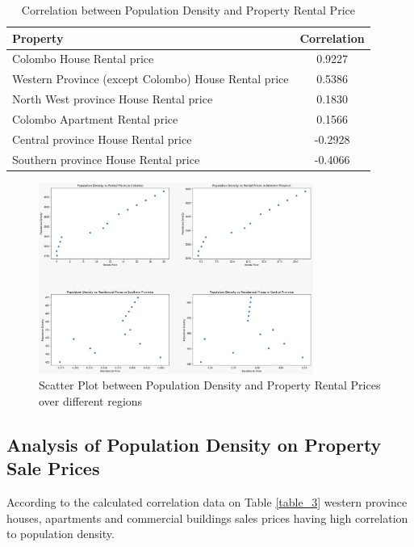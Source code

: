 \documentclass[conference]{IEEEtran}
\begin{document}
\begin{table}[h]
\caption{Correlation between Population Density and Property Rental Price}
\label{table_2}
\begin{center}
\begin{tabular}{|l|c|}
\hline
\textbf{Property} & \textbf{Correlation}\\
\hline
Colombo House Rental price & 0.9227\\
\hline
Western Province (except Colombo) House Rental price & 0.5386\\
\hline
North West province House Rental price & 0.1830\\
\hline
Colombo Apartment Rental price & 0.1566\\
\hline
Central province House Rental price & -0.2928\\
\hline
Southern province House Rental price & -0.4066\\

\hline
\end{tabular}
\end{center}
\end{table}


\begin{figure}
\centering
\includegraphics[width=9cm]{pop-den-rent-price.jpeg}
\caption{Scatter Plot between Population Density and Property Rental Prices over different regions}
\label{fig:figure2}
\end{figure}


\subsection{Analysis of Population Density on Property Sale Prices}

According to the calculated correlation data on Table \ref{table_3} western province houses, apartments and commercial buildings sales prices having high correlation to population density. 
\end{document}
